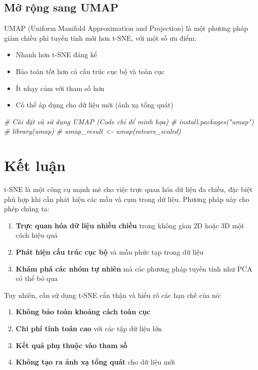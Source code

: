 \documentclass[
]{article}
\newenvironment{Shaded}{\begin{snugshade}}{\end{snugshade}}
\newcommand{\CommentTok}[1]{\textcolor[rgb]{0.56,0.35,0.01}{\textit{#1}}}
\providecommand{\tightlist}{%
  \setlength{\itemsep}{0pt}\setlength{\parskip}{0pt}}
\begin{document}
\subsection{Mở rộng sang UMAP}\label{mux1edf-rux1ed9ng-sang-umap}

UMAP (Uniform Manifold Approximation and Projection) là một phương pháp
giảm chiều phi tuyến tính mới hơn t-SNE, với một số ưu điểm:

\begin{itemize}
\tightlist
\item
  Nhanh hơn t-SNE đáng kể
\item
  Bảo toàn tốt hơn cả cấu trúc cục bộ và toàn cục
\item
  Ít nhạy cảm với tham số hơn
\item
  Có thể áp dụng cho dữ liệu mới (ánh xạ tổng quát)
\end{itemize}

\begin{Shaded}
\begin{Highlighting}[]
\CommentTok{\# Cài đặt và sử dụng UMAP (Code chỉ để minh họa)}
\CommentTok{\# install.packages("umap")}
\CommentTok{\# library(umap)}
\CommentTok{\# umap\_result \textless{}{-} umap(mtcars\_scaled)}
\end{Highlighting}
\end{Shaded}

\section{Kết luận}\label{kux1ebft-luux1eadn}

t-SNE là một công cụ mạnh mẽ cho việc trực quan hóa dữ liệu đa chiều,
đặc biệt phù hợp khi cần phát hiện các mẫu và cụm trong dữ liệu. Phương
pháp này cho phép chúng ta:

\begin{enumerate}
\def\labelenumi{\arabic{enumi}.}
\tightlist
\item
  \textbf{Trực quan hóa dữ liệu nhiều chiều} trong không gian 2D hoặc 3D
  một cách hiệu quả
\item
  \textbf{Phát hiện cấu trúc cục bộ} và mẫu phức tạp trong dữ liệu
\item
  \textbf{Khám phá các nhóm tự nhiên} mà các phương pháp tuyến tính như
  PCA có thể bỏ qua
\end{enumerate}

Tuy nhiên, cần sử dụng t-SNE cẩn thận và hiểu rõ các hạn chế của nó:

\begin{enumerate}
\def\labelenumi{\arabic{enumi}.}
\tightlist
\item
  \textbf{Không bảo toàn khoảng cách toàn cục}
\item
  \textbf{Chi phí tính toán cao} với các tập dữ liệu lớn
\item
  \textbf{Kết quả phụ thuộc vào tham số}
\item
  \textbf{Không tạo ra ánh xạ tổng quát} cho dữ liệu mới
\end{enumerate}
\end{document}
